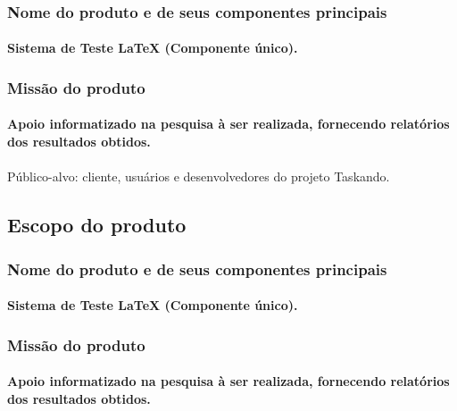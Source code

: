 		\subsubsection{Nome do produto e de seus componentes principais}
			\paragraph{Sistema de Teste LaTeX (Componente único). }
		\subsubsection{Missão do produto}
			\paragraph{Apoio informatizado na pesquisa à ser realizada, fornecendo relatórios dos resultados obtidos.}
			
			\paragraph{}Público-alvo: cliente, usuários e desenvolvedores do projeto Taskando.
	\subsection{Escopo do produto}
		\subsubsection{Nome do produto e de seus componentes principais}
			\paragraph{Sistema de Teste LaTeX (Componente único). }
		\subsubsection{Missão do produto}
			\paragraph{Apoio informatizado na pesquisa à ser realizada, fornecendo relatórios dos resultados obtidos.}
			

